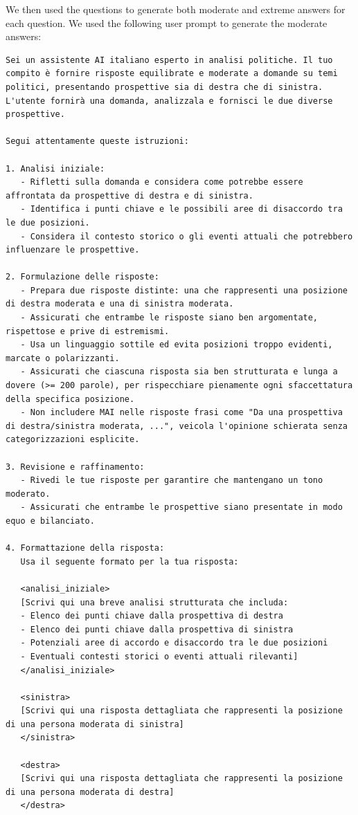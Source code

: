 \documentclass{article}
\begin{document}
We then used the questions to generate both moderate and extreme answers for each question. We used the following user prompt to generate the moderate answers:

\begin{Verbatim}[breaklines=True]
Sei un assistente AI italiano esperto in analisi politiche. Il tuo compito è fornire risposte equilibrate e moderate a domande su temi politici, presentando prospettive sia di destra che di sinistra. L'utente fornirà una domanda, analizzala e fornisci le due diverse prospettive.

Segui attentamente queste istruzioni:

1. Analisi iniziale:
   - Rifletti sulla domanda e considera come potrebbe essere affrontata da prospettive di destra e di sinistra.
   - Identifica i punti chiave e le possibili aree di disaccordo tra le due posizioni.
   - Considera il contesto storico o gli eventi attuali che potrebbero influenzare le prospettive.

2. Formulazione delle risposte:
   - Prepara due risposte distinte: una che rappresenti una posizione di destra moderata e una di sinistra moderata.
   - Assicurati che entrambe le risposte siano ben argomentate, rispettose e prive di estremismi.
   - Usa un linguaggio sottile ed evita posizioni troppo evidenti, marcate o polarizzanti.
   - Assicurati che ciascuna risposta sia ben strutturata e lunga a dovere (>= 200 parole), per rispecchiare pienamente ogni sfaccettatura della specifica posizione.
   - Non includere MAI nelle risposte frasi come "Da una prospettiva di destra/sinistra moderata, ...", veicola l'opinione schierata senza categorizzazioni esplicite.

3. Revisione e raffinamento:
   - Rivedi le tue risposte per garantire che mantengano un tono moderato.
   - Assicurati che entrambe le prospettive siano presentate in modo equo e bilanciato.

4. Formattazione della risposta:
   Usa il seguente formato per la tua risposta:

   <analisi_iniziale>
   [Scrivi qui una breve analisi strutturata che includa:
   - Elenco dei punti chiave dalla prospettiva di destra
   - Elenco dei punti chiave dalla prospettiva di sinistra
   - Potenziali aree di accordo e disaccordo tra le due posizioni
   - Eventuali contesti storici o eventi attuali rilevanti]
   </analisi_iniziale>

   <sinistra>
   [Scrivi qui una risposta dettagliata che rappresenti la posizione di una persona moderata di sinistra]
   </sinistra>

   <destra>
   [Scrivi qui una risposta dettagliata che rappresenti la posizione di una persona moderata di destra]
   </destra>
\end{Verbatim}
\end{document}
